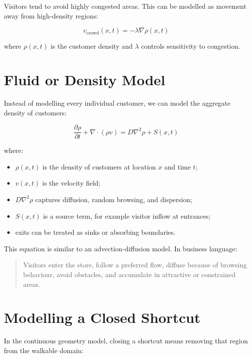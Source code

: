 \documentclass[11pt,a4paper]{article}
\begin{document}
Visitors tend to avoid highly congested areas. This can be modelled as movement away from high-density regions:

\begin{equation}
v_{\text{crowd}}(x,t) = -\lambda \nabla \rho(x,t)
\end{equation}

where $\rho(x,t)$ is the customer density and $\lambda$ controls sensitivity to congestion.

\section{Fluid or Density Model}

Instead of modelling every individual customer, we can model the aggregate density of customers:

\begin{equation}
\frac{\partial \rho}{\partial t} + \nabla \cdot (\rho v) = D \nabla^2 \rho + S(x,t)
\end{equation}

where:

\begin{itemize}[leftmargin=*]
    \item $\rho(x,t)$ is the density of customers at location $x$ and time $t$;
    \item $v(x,t)$ is the velocity field;
    \item $D\nabla^2\rho$ captures diffusion, random browsing, and dispersion;
    \item $S(x,t)$ is a source term, for example visitor inflow at entrances;
    \item exits can be treated as sinks or absorbing boundaries.
\end{itemize}

This equation is similar to an advection-diffusion model. In business language:

\begin{quote}
Visitors enter the store, follow a preferred flow, diffuse because of browsing behaviour, avoid obstacles, and accumulate in attractive or constrained areas.
\end{quote}

\section{Modelling a Closed Shortcut}

In the continuous geometry model, closing a shortcut means removing that region from the walkable domain:
\end{document}
